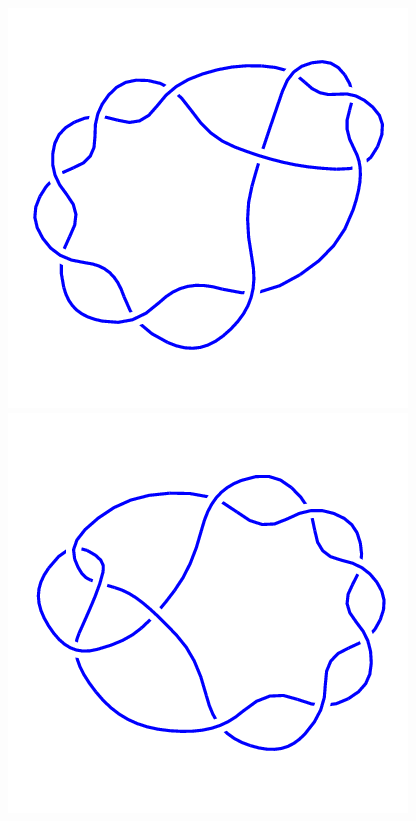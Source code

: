 \begin{figure}[H]
\begin{minipage}[b]{.18\linewidth}
    \end{minipage}
    \begin{minipage}[b]{.18\linewidth}
        \centering
        \includegraphics[width=\linewidth]{../data/10_4.png}
    \end{minipage}
    \begin{minipage}[b]{.18\linewidth}
        \centering
        \includegraphics[width=\linewidth]{../data/10_5.png}

\end{minipage}
\end{figure}
